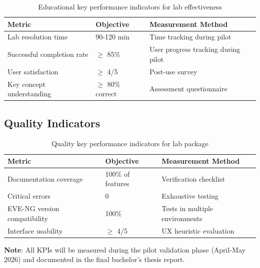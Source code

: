 \begin{table}[h!]
\centering
\begin{tabularx}{\textwidth}{|l|l|X|}
\hline
\textbf{Metric} & \textbf{Objective} & \textbf{Measurement Method} \\
\hline
Lab resolution time & 90-120 min & Time tracking during pilot \\
\hline
Successful completion rate & $\geq$ 85\% & User progress tracking during pilot \\
\hline
User satisfaction & $\geq$ 4/5 & Post-use survey \\
\hline
Key concept understanding & $\geq$ 80\% correct & Assessment questionnaire \\
\hline
\end{tabularx}
\caption[Educational KPIs]{Educational key performance indicators for lab effectiveness}
\label{tab:kpi_educational}
\end{table}

\subsection{Quality Indicators}

\begin{table}[h!]
\centering
\begin{tabularx}{\textwidth}{|l|l|X|}
\hline
\textbf{Metric} & \textbf{Objective} & \textbf{Measurement Method} \\
\hline
Documentation coverage & 100\% of features & Verification checklist \\
\hline
Critical errors & 0 & Exhaustive testing \\
\hline
EVE-NG version compatibility & 100\% & Tests in multiple environments \\
\hline
Interface usability & $\geq$ 4/5 & UX heuristic evaluation \\
\hline
\end{tabularx}
\caption[Quality KPIs]{Quality key performance indicators for lab package}
\label{tab:kpi_quality}
\end{table}

\noindent \textbf{Note}: All KPIs will be measured during the pilot validation phase (April-May 2026) and documented in the final bachelor's thesis report.